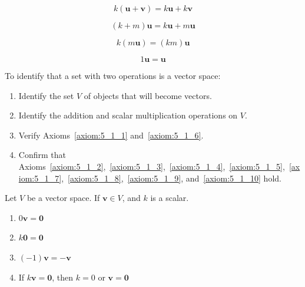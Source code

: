 \documentclass{article}
\begin{document}
\begin{axiom}
    \begin{equation*}
        \label{axiom:5_1_7}
        k \left(\symbf{u} + \symbf{v}\right) = k\symbf{u} + k\symbf{v}
    \end{equation*}
\end{axiom}
\begin{axiom}
    \begin{equation*}
        \label{axiom:5_1_8}
        \left(k+m\right)\symbf{u} = k\symbf{u} + m\symbf{u}
    \end{equation*}
\end{axiom}
\begin{axiom}
    \begin{equation*}
        \label{axiom:5_1_9}
        k\left(m\symbf{u}\right)=\left(km\right)\symbf{u}
    \end{equation*}
\end{axiom}
\begin{axiom}
    \begin{equation*}
        \label{axiom:5_1_10}
        1 \symbf{u}=\symbf{u}
    \end{equation*}
\end{axiom}
\noindent To identify that a set with two operations is a vector space:
\begin{enumerate}
    \item Identify the set \(V\) of objects that will become vectors.
    \item Identify the addition and scalar multiplication operations on
          \(V\).
    \item Verify Axioms~\ref{axiom:5_1_1} and~\ref{axiom:5_1_6}.
    \item Confirm that
          Axioms~\ref{axiom:5_1_2},~\ref{axiom:5_1_3},~\ref{axiom:5_1_4},~\ref{axiom:5_1_5},~\ref{axiom:5_1_7},~\ref{axiom:5_1_8},~\ref{axiom:5_1_9},
          and~\ref{axiom:5_1_10} hold.
\end{enumerate}
\begin{theorem}
    Let \(V\) be a vector space. If \(\symbf{v} \in V\), and \(k\) is
    a scalar.
    \begin{enumerate}
        \item \(0\symbf{v}=\symbf{0}\)
        \item \(k\symbf{0}=\symbf{0}\)
        \item \(\left(-1\right)\symbf{v}=-\symbf{v}\)
        \item If \(k\symbf{v}=\symbf{0}\), then \(k=0\) or
              \(\symbf{v}=\symbf{0}\)
    \end{enumerate}
\end{theorem}
\end{document}
